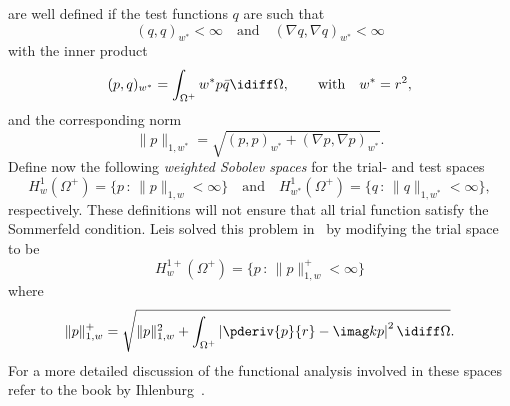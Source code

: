 are well defined if the test functions $q$ are such that
\begin{equation}
	(q,q)_{w^*}<\infty\quad\text{and}\quad (\nabla q,\nabla q)_{w^*}<\infty
\end{equation}
with the inner product
\begin{equation}
	(p,q)_{w^*} = \int_{\Omega^+} w^*p\bar{q}\idiff\Omega,\qquad\text{with}\quad w^*= r^2,
\end{equation}
and the corresponding norm
\begin{equation}
	\| p\|_{1,w^*} = \sqrt{(p,p)_{w^*} + (\nabla p,\nabla p)_{w^*}}.
\end{equation}
Define now the following \textit{weighted Sobolev spaces} for the trial- and test spaces
\begin{equation}
	H_w^1(\Omega^+) = \{p\,:\,\| p\|_{1,w} < \infty\}\quad\text{and}\quad H_{w^*}^1(\Omega^+) =  \{q\,:\,\| q\|_{1,w^*} < \infty\},
\end{equation}
respectively. These definitions will not ensure that all trial function satisfy the Sommerfeld condition. Leis solved this problem in~\cite{Leis1986ibv} by modifying the trial space to be
\begin{equation}
	H_w^{1+}(\Omega^+) = \{p\,:\,\| p\|_{1,w}^+ < \infty\}
\end{equation}
where
\begin{equation}
	\| p\|_{1,w}^+ = \sqrt{\| p\|_{1,w}^2 + \int_{\Omega^+}\left|\pderiv{p}{r} - \imag kp\right|^2\idiff\Omega}.
\end{equation}
For a more detailed discussion of the functional analysis involved in these spaces refer to the book by Ihlenburg~\cite[pp. 41-43]{Ihlenburg1998fea}.

